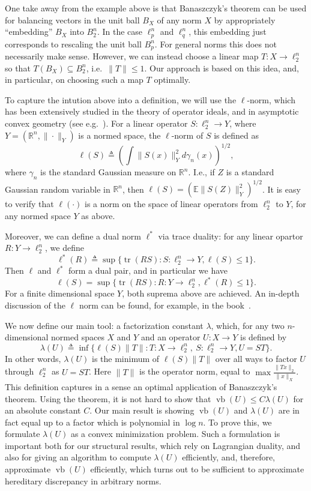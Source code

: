 \documentclass[11pt]{article}
\newcommand{\R}{{\mathbb{R}}}
\newcommand{\E}{\mathbb{E}}
\newcommand{\eqdef}{\triangleq}
\DeclareMathOperator{\vb}{vb}
\DeclareMathOperator{\tr}{tr}
\begin{document}
One take away from the example above is that Banaszczyk's theorem
can be used for balancing vectors in the unit ball $B_X$ of any norm
$X$ by appropriately ``embedding'' $B_X$ into $B_2^n$. In the case
$\ell^n_p$ and $\ell^n_q$, this embedding just corresponds to
rescaling the unit ball $B_p^n$. For general norms this does not
necessarily make sense. However, we can instead choose a linear map $T:X \to
\ell_2^n$ so that $T(B_X) \subseteq B_2^n$, i.e.~$\|T\| \le 1$. Our
approach is based on this idea, and, in particular, on choosing such a
map $T$ optimally.

To capture the intution above into a definition, we will use the
$\ell$-norm, which has been extensively studied in the theory of
operator ideals, and in asymptotic convex geometry (see
e.g.~\cite{TJ-book,Pisier-book,AGM-book}). For a linear operator
$S:\ell_2^n \to Y$, where $Y = (\R^n, \|\cdot\|_Y)$ is a normed space,
the $\ell$-norm of $S$ is defined as
\[
\ell(S) \eqdef \left( \int \|S(x)\|_Y^2 d\gamma_n(x) \right)^{1/2},
\]
where $\gamma_n$ is the standard Gaussian measure on $\R^n$. I.e., if
$Z$ is a standard Gaussian random variable in $\R^n$, then $\ell(S) =
(\E \|S(Z)\|_Y^2)^{1/2}$. It is easy to verify that $\ell(\cdot)$ is a
norm on the space of linear operators from $\ell_2^n$ to $Y$, for any
normed space $Y$ as above. 

Moreover, we can define a dual norm $\ell^*$ via trace duality: for
any linear opartor $R: Y \to \ell_2^n$, we define
\[
\ell^*(R) \eqdef \sup\{\tr(RS): S: \ell_2^n \to Y, \ell(S) \le 1\}.
\]
Then $\ell$ and $\ell^*$ form a dual pair, and in particular we have
\[
\ell(S) = \sup\{\tr(RS): R:Y\to\ell_2^n, \ell^*(R) \le 1\}.
\]
For a finite dimensional space $Y$, both suprema above are achieved.
An in-depth discussion of the $\ell$ norm can be found, for example,
in the book~\cite{TJ-book}.

We now define our main tool: a factorization constant $\lambda$, which, for any
two $n$-dimensional normed spaces $X$ and $Y$ and an operator $U:X \to
Y$ is defined by
\[
\lambda(U) \eqdef \inf \{\ell(S)\|T\|: T: X \to \ell_2^n,\ S: \ell_2^n
\to Y, U = ST\}.
\]
In other words, $\lambda(U)$ is the minimum of $\ell(S)\|T\|$ over all
ways to factor $U$ through $\ell_2^n$ as $U = ST$. Here $\|T\|$ is the
operator norm, equal to $\max \frac{\|Tx\|_2}{\|x\|_X}$. 
This definition
captures in a sense an optimal application of Banaszczyk's
theorem. Using the theorem, it is not hard to show that $\vb(U) \le
C\lambda(U)$ for an absolute constant $C$. Our main result is showing
$\vb(U)$ and $\lambda(U)$ are in fact equal up to a factor which is
polynomial in $\log n$. To prove this, we formulate $\lambda(U)$ as a
convex minimization problem. Such a formulation is important both for
our structural results, which rely on Lagrangian duality, and also for
giving an algorithm to compute $\lambda(U)$ efficiently, and,
therefore, approximate $\vb(U)$ efficiently, which turns out to be
sufficient to approximate hereditary discrepancy in arbitrary norms.
\end{document}
